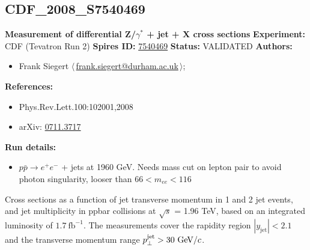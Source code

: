 \subsection[CDF\_2008\_S7540469]{CDF\_2008\_S7540469\,\cite{:2007cp}}
\textbf{Measurement of differential Z/$\gamma^*$ + jet + X cross sections}\newline
\textbf{Experiment:} CDF (Tevatron Run 2) \newline
\textbf{Spires ID:} \href{http://www.slac.stanford.edu/spires/find/hep/www?rawcmd=key+7540469}{7540469}\newline
\textbf{Status:} VALIDATED\newline
\textbf{Authors:}
\begin{itemize}
  \item Frank Siegert $\langle\,$\href{mailto:frank.siegert@durham.ac.uk}{frank.siegert@durham.ac.uk}$\,\rangle$;
\end{itemize}
\textbf{References:}
\begin{itemize}
  \item Phys.Rev.Lett.100:102001,2008
  \item arXiv: \href{http://arxiv.org/abs/0711.3717}{0711.3717}
\end{itemize}
\textbf{Run details:}
\begin{itemize}

  \item $p \bar{p} \to e^+ e^-$ + jets at 1960 GeV. Needs mass cut on lepton pair to  avoid photon singularity, looser than $66 < m_{ee} < 116$\end{itemize}

\noindent Cross sections as a function of jet transverse momentum in 1 and 2 jet events, and jet multiplicity in ppbar collisions at \ensuremath{\sqrt{s}} = 1.96 TeV, based on an integrated luminosity of $1.7~\text{fb}^{-1}$. The  measurements cover the rapidity region $|y_\text{jet}| < 2.1$ and  the transverse momentum range $p_\perp^\text{jet} > 30~\text{GeV}/c$.

\clearpage


\clearpage

